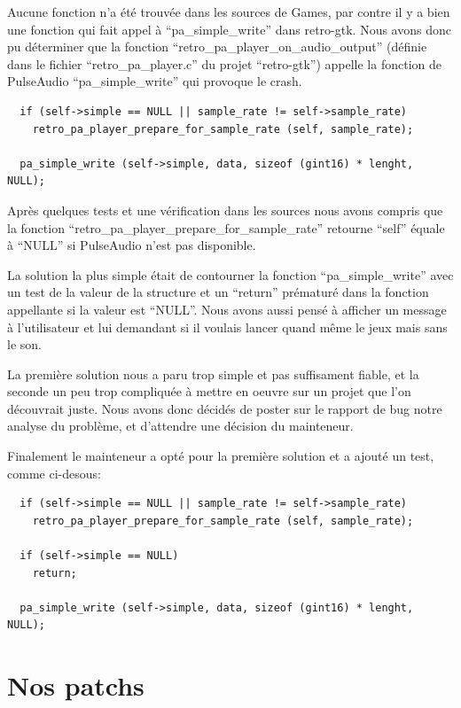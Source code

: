 \documentclass[12pt]{report}
\begin{document}
Aucune fonction n'a été trouvée dans les sources de Games, par contre il y a bien
une fonction qui fait appel à ``pa\_simple\_write'' dans retro-gtk.
Nous avons donc pu déterminer que la fonction
``retro\_pa\_player\_on\_audio\_output'' (définie dans le fichier
``retro\_pa\_player.c'' du projet ``retro-gtk'') appelle la fonction de PulseAudio
``pa\_simple\_write'' qui provoque le crash.

\begin{verbatim}
  if (self->simple == NULL || sample_rate != self->sample_rate)
    retro_pa_player_prepare_for_sample_rate (self, sample_rate);

  pa_simple_write (self->simple, data, sizeof (gint16) * lenght, NULL);
\end{verbatim}
  
Après quelques tests et une vérification dans les sources nous  avons compris
que la fonction ``retro\_pa\_player\_prepare\_for\_sample\_rate'' retourne ``self''
équale à ``NULL'' si PulseAudio n'est pas disponible.

La solution la plus simple était de contourner la fonction ``pa\_simple\_write''
avec un test de la valeur de la structure et un ``return'' prématuré dans la fonction
appellante si la valeur est ``NULL''. Nous avons aussi pensé à afficher un message à
l'utilisateur et lui demandant si il voulais lancer quand même le jeux mais sans le son.

La première solution nous a paru trop simple et pas suffisament fiable, et la
seconde un peu trop compliquée à mettre en oeuvre sur un projet que l'on découvrait juste.
Nous avons donc décidés de poster sur le rapport de bug notre analyse du problème, et
d'attendre une décision du mainteneur.

Finalement le mainteneur a opté pour la première solution et a ajouté un test, comme
ci-desous:
\begin{verbatim}
  if (self->simple == NULL || sample_rate != self->sample_rate)
    retro_pa_player_prepare_for_sample_rate (self, sample_rate);

  if (self->simple == NULL)
    return;

  pa_simple_write (self->simple, data, sizeof (gint16) * lenght, NULL);
\end{verbatim}

\section{Nos patchs}
\end{document}
